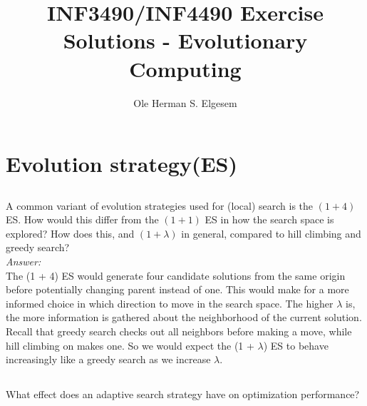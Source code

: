 
\title{\vspace{-2cm}INF3490/INF4490 Exercise Solutions - Evolutionary Computing}
\author{Ole Herman S. Elgesem}
\date{}

\setlength\parindent{0pt}


    \renewcommand\marginsymbol[1][0pt]{%
  \tabto*{0cm}\makebox[-1cm][c]{$\mathbb{P}$}\tabto*{\TabPrevPos}}

\maketitle


\section{Evolution strategy(ES)} %
\subsection{} %
A common variant of evolution strategies used for (local) search is the \((1 + 4)\) ES.
How would this differ from the \((1 + 1)\) ES in how the search space is explored?
How does this, and \((1 + \lambda)\) in general, compared to hill climbing and greedy search?\\

\textit{Answer:}\\

The (1 + 4) ES would generate four candidate solutions from the same origin before potentially changing parent instead of one.
This would make for a more informed choice in which direction to move in the search space.
The higher \(\lambda\) is, the more information is gathered about the neighborhood of the current solution.
Recall that greedy search checks out all neighbors before making a move, while hill climbing on makes one.
So we would expect the (1 + \(\lambda\)) ES to behave increasingly like a greedy search as we increase \(\lambda\).

\subsection{} %
What effect does an adaptive search strategy have on optimization performance?\\

